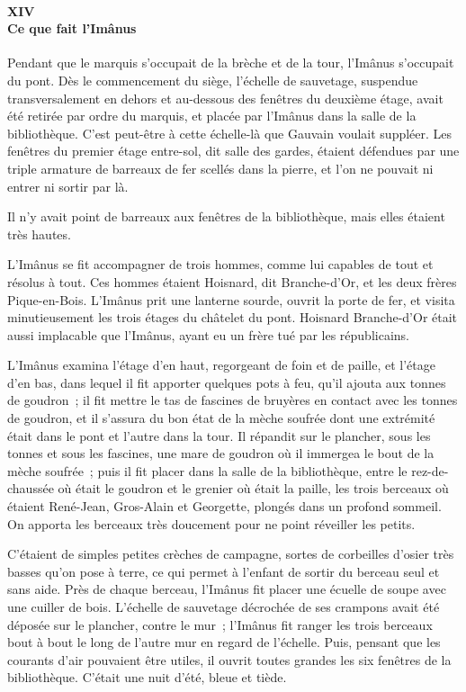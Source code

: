 \documentclass[french,twoside]{book} %
\begin{document}
 \paragraph[{XIV. Ce que fait l’Imânus}]{XIV \\
Ce que fait l’Imânus}
\label{p3l2c14}
\noindent Pendant que le marquis s’occupait de la brèche et de la tour, l’Imânus s’occupait du pont. Dès le commencement du siège, l’échelle de sauvetage, suspendue transversalement en dehors et au-dessous des fenêtres du deuxième étage, avait été retirée par ordre du marquis, et placée par l’Imânus dans la salle de la bibliothèque. C’est peut-être à cette échelle-là que Gauvain voulait suppléer. Les fenêtres du premier étage entre-sol, dit salle des gardes, étaient défendues par une triple armature de barreaux de fer scellés dans la pierre, et l’on ne pouvait ni entrer ni sortir par là.\par
Il n’y avait point de barreaux aux fenêtres de la bibliothèque, mais elles étaient très hautes.\par
L’Imânus se fit accompagner de trois hommes, comme lui capables de tout et résolus à tout. Ces hommes étaient Hoisnard, dit Branche-d’Or, et les deux frères Pique-en-Bois. L’Imânus prit une lanterne sourde, ouvrit la porte de fer, et visita minutieusement les trois étages du châtelet du pont. Hoisnard Branche-d’Or était aussi implacable que l’Imânus, ayant eu un frère tué par les républicains.\par
 L’Imânus examina l’étage d’en haut, regorgeant de foin et de paille, et l’étage d’en bas, dans lequel il fit apporter quelques pots à feu, qu’il ajouta aux tonnes de goudron ; il fit mettre le tas de fascines de bruyères en contact avec les tonnes de goudron, et il s’assura du bon état de la mèche soufrée dont une extrémité était dans le pont et l’autre dans la tour. Il répandit sur le plancher, sous les tonnes et sous les fascines, une mare de goudron où il immergea le bout de la mèche soufrée ; puis il fit placer dans la salle de la bibliothèque, entre le rez-de-chaussée où était le goudron et le grenier où était la paille, les trois berceaux où étaient René-Jean, Gros-Alain et Georgette, plongés dans un profond sommeil. On apporta les berceaux très doucement pour ne point réveiller les petits.\par
C’étaient de simples petites crèches de campagne, sortes de corbeilles d’osier très basses qu’on pose à terre, ce qui permet à l’enfant de sortir du berceau seul et sans aide. Près de chaque berceau, l’Imânus fit placer une écuelle de soupe avec une cuiller de bois. L’échelle de sauvetage décrochée de ses crampons avait été déposée sur le plancher, contre le mur ; l’Imânus fit ranger les trois berceaux bout à bout le long de l’autre mur en regard de l’échelle. Puis, pensant que les courants d’air pouvaient être utiles, il ouvrit toutes grandes les six fenêtres de la bibliothèque. C’était une nuit d’été, bleue et tiède.\par
\end{document}
